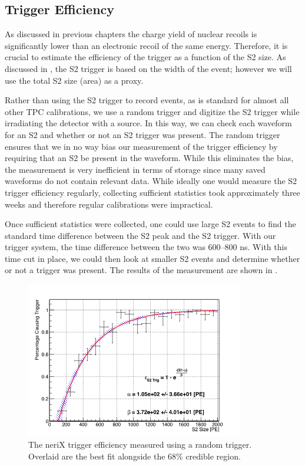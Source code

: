 \subsection{Trigger Efficiency}
\label{sec:nerix_trig_efficiency}

As discussed in previous chapters the charge yield of nuclear recoils is significantly lower than an electronic recoil of the same energy.  Therefore, it is crucial to estimate the efficiency of the trigger as a function of the S2 size.  As discussed in , the S2 trigger is based on the width of the event; however we will use the total S2 size (area) as a proxy.

Rather than using the S2 trigger to record events, as is standard for almost all other TPC calibrations, we use a random trigger and digitize the S2 trigger while irradiating the detector with a \sodium{} source.  In this way, we can check each waveform for an S2 and whether or not an S2 trigger was present.  The random trigger ensures that we in no way bias our measurement of the trigger efficiency by requiring that an S2 be present in the waveform.  While this eliminates the bias, the measurement is very inefficient in terms of storage since many saved waveforms do not contain relevant data.  While ideally one would measure the S2 trigger efficiency regularly, collecting sufficient statistics took approximately three weeks and therefore regular calibrations were impractical.

Once sufficient statistics were collected, one could use large S2 events to find the standard time difference between the S2 peak and the S2 trigger.  With our trigger system, the time difference between the two was 600--800 ns.  With this time cut in place, we could then look at smaller S2 events and determine whether or not a trigger was present.  The results of the measurement are shown in .

\begin{figure}[t]
        \centering
	\includegraphics[width=0.85\textwidth]{nerix_trigger_efficiency}
	\caption{The neriX trigger efficiency measured using a random trigger.  Overlaid are the best fit alongside the 68\% credible region.}
	\label{fig:nerix_trigger_efficiency}
\end{figure}



